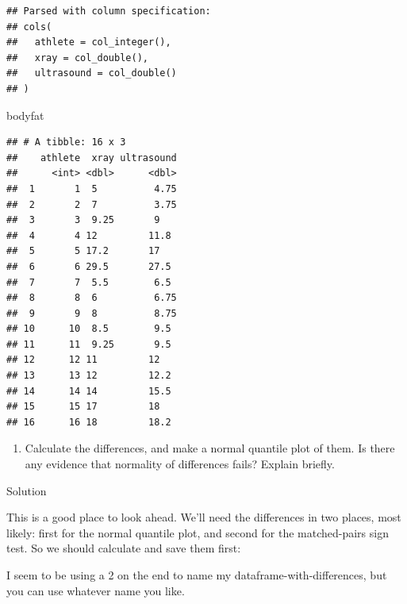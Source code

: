 \documentclass[]{tufte-book}
\newenvironment{Shaded}{}{}
\newcommand{\DataTypeTok}[1]{\textcolor[rgb]{0.56,0.13,0.00}{#1}}
\newcommand{\KeywordTok}[1]{\textcolor[rgb]{0.00,0.44,0.13}{\textbf{#1}}}
\newcommand{\NormalTok}[1]{#1}
\newcommand{\OperatorTok}[1]{\textcolor[rgb]{0.40,0.40,0.40}{#1}}
\newcommand{\StringTok}[1]{\textcolor[rgb]{0.25,0.44,0.63}{#1}}
\providecommand{\tightlist}{%
  \setlength{\itemsep}{0pt}\setlength{\parskip}{0pt}}
\theoremstyle{definition}
\theoremstyle{definition}
\theoremstyle{definition}
\theoremstyle{remark}
\begin{document}
\begin{verbatim}
## Parsed with column specification:
## cols(
##   athlete = col_integer(),
##   xray = col_double(),
##   ultrasound = col_double()
## )
\end{verbatim}

\begin{Shaded}
\begin{Highlighting}[]
\NormalTok{bodyfat}
\end{Highlighting}
\end{Shaded}

\begin{verbatim}
## # A tibble: 16 x 3
##    athlete  xray ultrasound
##      <int> <dbl>      <dbl>
##  1       1  5          4.75
##  2       2  7          3.75
##  3       3  9.25       9   
##  4       4 12         11.8 
##  5       5 17.2       17   
##  6       6 29.5       27.5 
##  7       7  5.5        6.5 
##  8       8  6          6.75
##  9       9  8          8.75
## 10      10  8.5        9.5 
## 11      11  9.25       9.5 
## 12      12 11         12   
## 13      13 12         12.2 
## 14      14 14         15.5 
## 15      15 17         18   
## 16      16 18         18.2
\end{verbatim}

\begin{enumerate}
\def\labelenumi{(\alph{enumi})}
\setcounter{enumi}{1}
\tightlist
\item
  Calculate the differences, and make a normal quantile plot of them. Is
  there any evidence that normality of differences fails? Explain
  briefly.
\end{enumerate}

Solution

This is a good place to look ahead. We'll need the differences in two
places, most likely: first for the normal quantile plot, and second for
the matched-pairs sign test. So we should calculate and save them first:

\begin{Shaded}
\end{Shaded}

I seem to be using a 2 on the end to name my dataframe-with-differences,
but you can use whatever name you like.
\end{document}
